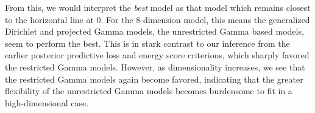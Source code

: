 From this, we would interpret the \emph{best} model as that model which remains closest to the
  horizontal line at $0$.  For the 8-dimension model, this means the generalized Dirichlet and
  projected Gamma models, the unrestricted Gamma based models, seem to perform the best.   This is
  in stark contrast to our inference from the earlier posterior predictive loss and energy score
  criterions, which sharply favored the restricted Gamma models.  However, as dimensionality
  increases, we see that the restricted Gamma models again become favored, indicating that the
  greater flexibility of the unrestricted Gamma models becomes burdensome to fit in a
  high-dimensional case.



